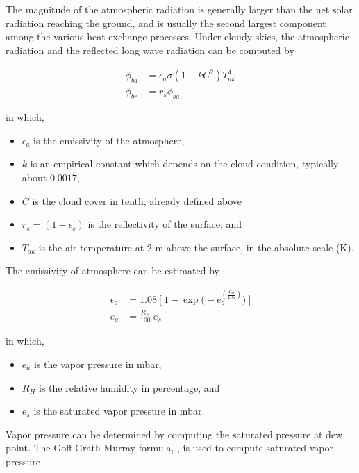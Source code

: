 The magnitude of the atmospheric radiation is generally larger than the net solar radiation reaching the ground, and is usually the second largest component among the various heat exchange processes. Under cloudy skies, the atmospheric radiation and the reflected long wave radiation can be computed by

\begin{equation} \label{eq:phiba}
\begin{aligned}
\phi_{ba} &= \epsilon_a\sigma ( 1+kC^2 )T_{ak}^4 \\
\phi_{br} &= r_s\phi_{ba}
\end{aligned}
\end{equation}

in which,
\begin{itemize}
	\item $\epsilon_a$ is the emissivity of the atmosphere,
	\item $k$ is an empirical constant which depends on the cloud condition, typically about $0.0017$,
	\item $C$ is the cloud cover in tenth, already defined above
	\item $r_s=(1-\epsilon_s)$ is the reflectivity of the surface, and
	\item $T_{ak}$ is the air temperature at $2$ m above the surface, in the absolute scale (K).
\end{itemize}

The emissivity of atmosphere can be estimated by \cite{satterlund1979improved}:

\begin{equation} \label{eq:ea}
\begin{aligned}
\epsilon_a &= 1.08\ \Big[\ 1-\exp\Big(-e_a^{(\frac{T_{ak}}{106})}\Big)\ \Big] \\
e_a &= \frac{R_H}{100}\ e_s
\end{aligned}
\end{equation}

in which,
\begin{itemize}
	\item $e_a$ is the vapor pressure in mbar,
	\item $R_H$ is the relative humidity in percentage, and
	\item $e_s$ is the saturated vapor pressure in mbar.
\end{itemize}

Vapor pressure can be determined by computing the saturated pressure at dew point. The Goff-Grath-Murray formula, \cite{goff1946low}, is used to compute saturated vapor pressure

